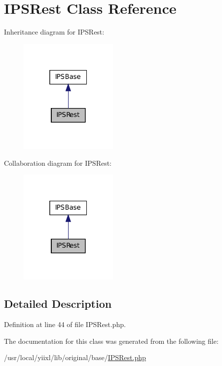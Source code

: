 \hypertarget{classIPSRest}{
\section{IPSRest Class Reference}
\label{classIPSRest}
}


Inheritance diagram for IPSRest:\nopagebreak
\begin{figure}[H]
\begin{center}
\leavevmode
\includegraphics[width=136pt]{classIPSRest__inherit__graph}
\end{center}
\end{figure}


Collaboration diagram for IPSRest:\nopagebreak
\begin{figure}[H]
\begin{center}
\leavevmode
\includegraphics[width=136pt]{classIPSRest__coll__graph}
\end{center}
\end{figure}


\subsection{Detailed Description}


Definition at line 44 of file IPSRest.php.



The documentation for this class was generated from the following file:\begin{DoxyCompactItemize}
\item 
/usr/local/yiixl/lib/original/base/\hyperlink{IPSRest_8php}{IPSRest.php}\end{DoxyCompactItemize}
